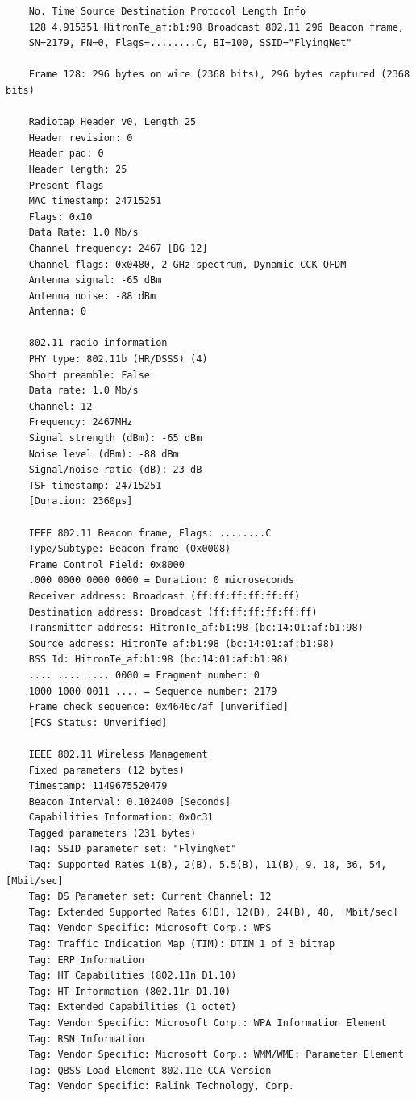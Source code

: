 \documentclass{article}
\begin{document}
\begin{verbatim}
    No. Time Source Destination Protocol Length Info
    128 4.915351 HitronTe_af:b1:98 Broadcast 802.11 296 Beacon frame,
    SN=2179, FN=0, Flags=........C, BI=100, SSID="FlyingNet"

    Frame 128: 296 bytes on wire (2368 bits), 296 bytes captured (2368 bits)

    Radiotap Header v0, Length 25
    Header revision: 0
    Header pad: 0
    Header length: 25
    Present flags
    MAC timestamp: 24715251
    Flags: 0x10
    Data Rate: 1.0 Mb/s
    Channel frequency: 2467 [BG 12]
    Channel flags: 0x0480, 2 GHz spectrum, Dynamic CCK-OFDM
    Antenna signal: -65 dBm
    Antenna noise: -88 dBm
    Antenna: 0

    802.11 radio information
    PHY type: 802.11b (HR/DSSS) (4)
    Short preamble: False
    Data rate: 1.0 Mb/s
    Channel: 12
    Frequency: 2467MHz
    Signal strength (dBm): -65 dBm
    Noise level (dBm): -88 dBm
    Signal/noise ratio (dB): 23 dB
    TSF timestamp: 24715251
    [Duration: 2360µs]

    IEEE 802.11 Beacon frame, Flags: ........C
    Type/Subtype: Beacon frame (0x0008)
    Frame Control Field: 0x8000
    .000 0000 0000 0000 = Duration: 0 microseconds
    Receiver address: Broadcast (ff:ff:ff:ff:ff:ff)
    Destination address: Broadcast (ff:ff:ff:ff:ff:ff)
    Transmitter address: HitronTe_af:b1:98 (bc:14:01:af:b1:98)
    Source address: HitronTe_af:b1:98 (bc:14:01:af:b1:98)
    BSS Id: HitronTe_af:b1:98 (bc:14:01:af:b1:98)
    .... .... .... 0000 = Fragment number: 0
    1000 1000 0011 .... = Sequence number: 2179
    Frame check sequence: 0x4646c7af [unverified]
    [FCS Status: Unverified]

    IEEE 802.11 Wireless Management
    Fixed parameters (12 bytes)
    Timestamp: 1149675520479
    Beacon Interval: 0.102400 [Seconds]
    Capabilities Information: 0x0c31
    Tagged parameters (231 bytes)
    Tag: SSID parameter set: "FlyingNet"
    Tag: Supported Rates 1(B), 2(B), 5.5(B), 11(B), 9, 18, 36, 54, [Mbit/sec]
    Tag: DS Parameter set: Current Channel: 12
    Tag: Extended Supported Rates 6(B), 12(B), 24(B), 48, [Mbit/sec]
    Tag: Vendor Specific: Microsoft Corp.: WPS
    Tag: Traffic Indication Map (TIM): DTIM 1 of 3 bitmap
    Tag: ERP Information
    Tag: HT Capabilities (802.11n D1.10)
    Tag: HT Information (802.11n D1.10)
    Tag: Extended Capabilities (1 octet)
    Tag: Vendor Specific: Microsoft Corp.: WPA Information Element
    Tag: RSN Information
    Tag: Vendor Specific: Microsoft Corp.: WMM/WME: Parameter Element
    Tag: QBSS Load Element 802.11e CCA Version
    Tag: Vendor Specific: Ralink Technology, Corp.
\end{verbatim}
\end{document}
